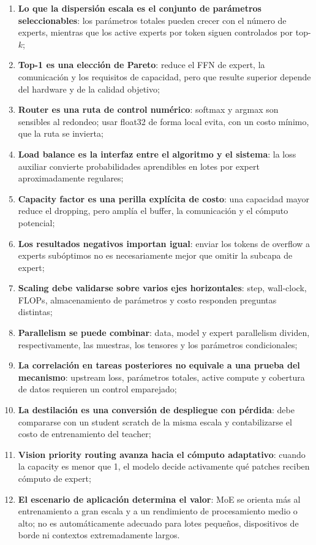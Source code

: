 \begin{enumerate}
  \item \textbf{Lo que la dispersión escala es el conjunto de parámetros seleccionables}: los parámetros totales pueden crecer con el número de experts, mientras que los active experts por token siguen controlados por top-$k$;
  \item \textbf{Top-1 es una elección de Pareto}: reduce el FFN de expert, la comunicación y los requisitos de capacidad, pero que resulte superior depende del hardware y de la calidad objetivo;
  \item \textbf{Router es una ruta de control numérico}: softmax y argmax son sensibles al redondeo; usar float32 de forma local evita, con un costo mínimo, que la ruta se invierta;
  \item \textbf{Load balance es la interfaz entre el algoritmo y el sistema}: la loss auxiliar convierte probabilidades aprendibles en lotes por expert aproximadamente regulares;
  \item \textbf{Capacity factor es una perilla explícita de costo}: una capacidad mayor reduce el dropping, pero amplía el buffer, la comunicación y el cómputo potencial;
  \item \textbf{Los resultados negativos importan igual}: enviar los tokens de overflow a experts subóptimos no es necesariamente mejor que omitir la subcapa de expert;
  \item \textbf{Scaling debe validarse sobre varios ejes horizontales}: step, wall-clock, FLOPs, almacenamiento de parámetros y costo responden preguntas distintas;
  \item \textbf{Parallelism se puede combinar}: data, model y expert parallelism dividen, respectivamente, las muestras, los tensores y los parámetros condicionales;
  \item \textbf{La correlación en tareas posteriores no equivale a una prueba del mecanismo}: upstream loss, parámetros totales, active compute y cobertura de datos requieren un control emparejado;
  \item \textbf{La destilación es una conversión de despliegue con pérdida}: debe compararse con un student scratch de la misma escala y contabilizarse el costo de entrenamiento del teacher;
  \item \textbf{Vision priority routing avanza hacia el cómputo adaptativo}: cuando la capacity es menor que 1, el modelo decide activamente qué patches reciben cómputo de expert;
  \item \textbf{El escenario de aplicación determina el valor}: MoE se orienta más al entrenamiento a gran escala y a un rendimiento de procesamiento medio o alto; no es automáticamente adecuado para lotes pequeños, dispositivos de borde ni contextos extremadamente largos.
\end{enumerate}


